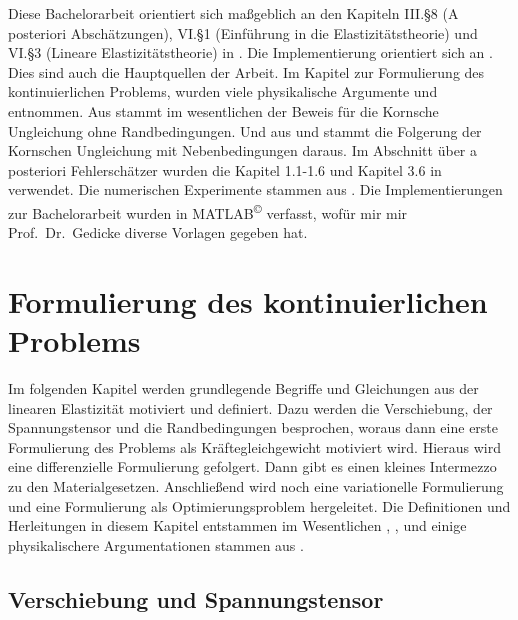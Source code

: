 \documentclass{scrartcl}
\begin{document}
Diese Bachelorarbeit orientiert sich maßgeblich an den Kapiteln III.§8 (A posteriori Abschätzungen), VI.§1 (Einführung in die Elastizitätstheorie) und VI.§3 (Lineare Elasti\-zitäts\-theorie) in \cite{Bra-2007}. Die Implementierung orientiert sich an \cite{Alb-2002}. Dies sind auch die Hauptquellen der Arbeit.
Im Kapitel zur Formulierung des kontinuierlichen Problems, wurden viele physikalische Argumente \cite{Lif-1959} und \cite{Duv-1976} entnommen.
Aus \cite{Nit-1981} stammt im wesentlichen der Beweis für die Kornsche Ungleichung ohne Randbedingungen.
Und aus \cite{Cia-1988} und \cite{Kik-1988} stammt die Folgerung der Kornschen Ungleichung mit Nebenbedingungen daraus.
Im Abschnitt über a posteriori Fehlerschätzer wurden die Kapitel 1.1-1.6 und Kapitel 3.6 in \cite{Ver-2013} verwendet.
Die numerischen Experimente stammen aus \cite{Car-2011}. 
Die Implementierungen zur Bachelorarbeit wurden in MATLAB\textsuperscript{\copyright} verfasst, wofür mir mir Prof.\ Dr.\ Gedicke diverse Vorlagen gegeben hat.

\newpage 

\section{Formulierung des kontinuierlichen Problems}\label{ch:FormulierungKontinuierlichesProblem}

Im folgenden Kapitel werden grundlegende Begriffe und Gleichungen aus der linearen Elastizität motiviert und definiert. Dazu werden die Verschiebung, der Spannungstensor
und die Randbedingungen besprochen, woraus dann eine erste Formulierung des Problems als Kräftegleichgewicht motiviert wird. Hieraus wird eine differenzielle Formulierung gefolgert. Dann gibt es einen kleines Intermezzo zu den Materialgesetzen. Anschließend wird noch eine variationelle Formulierung und eine Formulierung als Optimierungsproblem hergeleitet.
Die Definitionen und Herleitungen in diesem Kapitel entstammen im Wesentlichen \cite[Kapitel VI.§1]{Bra-2007}, \cite[Kapitel III]{Duv-1976}, \cite{Cia-1988} und einige physikalischere Argumentationen stammen aus \cite{Lif-1959}.

\subsection{Verschiebung und Spannungstensor}
\end{document}
